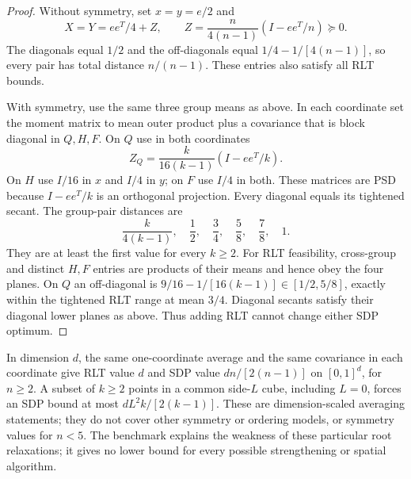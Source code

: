\begin{proof}
Without symmetry, set $x=y=e/2$ and
\begin{equation}\label{eq:packing-covariance}
 X=Y=ee^T/4+Z,\qquad
 Z=\frac{n}{4(n-1)}(I-ee^T/n)\succeq0.
\end{equation}
The diagonals equal $1/2$ and the off-diagonals equal
$1/4-1/[4(n-1)]$, so every pair has total distance $n/(n-1)$.
These entries also satisfy all RLT bounds.

With symmetry, use the same three group means as above. In each coordinate
set the moment matrix to mean outer product plus a covariance that is
block diagonal in $Q,H,F$. On $Q$ use in both coordinates
\[
 Z_Q=\frac{k}{16(k-1)}(I-ee^T/k).
\]
On $H$ use $I/16$ in $x$ and $I/4$ in $y$; on $F$ use $I/4$ in both.
These matrices are PSD because $I-ee^T/k$ is an orthogonal projection.
Every diagonal equals its tightened secant. The group-pair distances are
\[
 \frac{k}{4(k-1)},\quad\frac12,\quad\frac34,\quad
 \frac58,\quad\frac78,\quad1.
\]
They are at least the first value for every $k\ge2$.
For RLT feasibility, cross-group and distinct $H,F$ entries are products
of their means and hence obey the four planes. On $Q$ an off-diagonal is
$9/16-1/[16(k-1)]\in[1/2,5/8]$, exactly within the tightened RLT range
at mean $3/4$. Diagonal secants satisfy their diagonal lower planes as
above. Thus adding RLT cannot change either SDP optimum.
\end{proof}

In dimension $d$, the same one-coordinate average and the same covariance
in each coordinate give RLT value $d$ and SDP value
$dn/[2(n-1)]$ on $[0,1]^d$, for $n\ge2$. A subset of $k\ge2$ points
in a common side-$L$ cube, including $L=0$, forces an SDP bound at most
$dL^2k/[2(k-1)]$. These are dimension-scaled averaging statements; they
do not cover other symmetry or ordering models, or symmetry values for
$n<5$. The benchmark explains the weakness of these particular root
relaxations; it gives no lower bound for every possible strengthening
or spatial algorithm.
